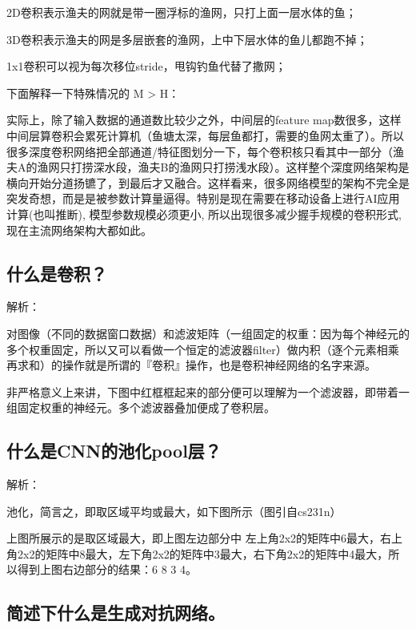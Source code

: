 \documentclass[UTF8]{ctexbook}
\begin{document}
2D卷积表示渔夫的网就是带一圈浮标的渔网，只打上面一层水体的鱼；

3D卷积表示渔夫的网是多层嵌套的渔网，上中下层水体的鱼儿都跑不掉；

1x1卷积可以视为每次移位stride，甩钩钓鱼代替了撒网；



下面解释一下特殊情况的 M > H：

实际上，除了输入数据的通道数比较少之外，中间层的feature map数很多，这样中间层算卷积会累死计算机（鱼塘太深，每层鱼都打，需要的鱼网太重了）。所以很多深度卷积网络把全部通道/特征图划分一下，每个卷积核只看其中一部分（渔夫A的渔网只打捞深水段，渔夫B的渔网只打捞浅水段）。这样整个深度网络架构是横向开始分道扬镳了，到最后才又融合。这样看来，很多网络模型的架构不完全是突发奇想，而是是被参数计算量逼得。特别是现在需要在移动设备上进行AI应用计算(也叫推断), 模型参数规模必须更小, 所以出现很多减少握手规模的卷积形式, 现在主流网络架构大都如此。



\subsection{什么是卷积？}

解析：

对图像（不同的数据窗口数据）和滤波矩阵（一组固定的权重：因为每个神经元的多个权重固定，所以又可以看做一个恒定的滤波器filter）做内积（逐个元素相乘再求和）的操作就是所谓的『卷积』操作，也是卷积神经网络的名字来源。

非严格意义上来讲，下图中红框框起来的部分便可以理解为一个滤波器，即带着一组固定权重的神经元。多个滤波器叠加便成了卷积层。




\subsection{什么是CNN的池化pool层？}

解析：

池化，简言之，即取区域平均或最大，如下图所示（图引自cs231n）



 上图所展示的是取区域最大，即上图左边部分中 左上角2x2的矩阵中6最大，右上角2x2的矩阵中8最大，左下角2x2的矩阵中3最大，右下角2x2的矩阵中4最大，所以得到上图右边部分的结果：6 8 3 4。



\subsection{简述下什么是生成对抗网络。}
\end{document}
